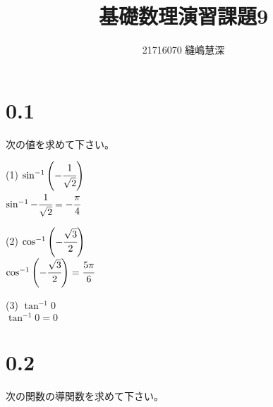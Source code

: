 \documentclass[fleqn]{jsarticle}
\title{\vspace{-50mm} 基礎数理演習課題9}
\author{21716070 縫嶋慧深}
\begin{document}
	\maketitle

    \section*{0.1}
    次の値を求めて下さい。

    \begin{description}
        \setlength{\itemsep}{0.5cm}

        \begin{multicols}{3}

            \item[(1)]
                $ \sin^{-1}{\left(-\cfrac{1}{\sqrt{2}}\right)} $ \\
                $ \sin^{-1}{-\cfrac{1}{\sqrt{2}}} = -\cfrac{\pi}{4} $

            \item[(2)]
                $ \cos^{-1}{\left(-\cfrac{\sqrt{3}}{2}\right)} $ \\
                $ \cos^{-1}{\left(-\cfrac{\sqrt{3}}{2}\right)} = \cfrac{5\pi}{6} $

            \item[(3)]
                $ \tan^{-1}{0} $ \\
                $ \tan^{-1}{0} = 0 $

        \end{multicols}

    \end{description}


    \vspace{-5mm} \section*{0.2}
    次の関数の導関数を求めて下さい。
\end{document}
